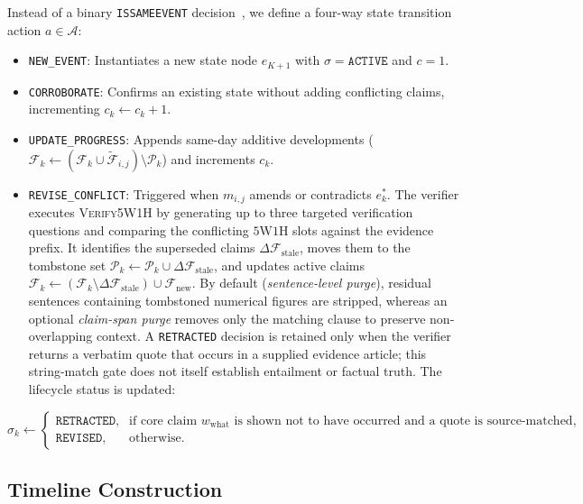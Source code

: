 \documentclass[journal]{IEEEtran}
\begin{document}
Instead of a binary \texttt{ISSAMEEVENT} decision~\cite{hu2024moments}, we define a four-way state transition action $a \in \mathcal{A}$:
\begin{itemize}
    \item \texttt{NEW\_EVENT}: Instantiates a new state node $e_{K+1}$ with $\sigma = \texttt{ACTIVE}$ and $c = 1$.
    \item \texttt{CORROBORATE}: Confirms an existing state without adding conflicting claims, incrementing $c_k \leftarrow c_k + 1$.
    \item \texttt{UPDATE\_PROGRESS}: Appends same-day additive developments ($\mathcal{F}_k \leftarrow (\mathcal{F}_k \cup \tilde{\mathcal{F}}_{i,j}) \setminus \mathcal{P}_k$) and increments $c_k$.
    \item \texttt{REVISE\_CONFLICT}: Triggered when $m_{i,j}$ amends or contradicts $e_k^*$. The verifier executes \textsc{Verify5W1H} by generating up to three targeted verification questions and comparing the conflicting $5\text{W}1\text{H}$ slots against the evidence prefix. It identifies the superseded claims $\Delta\mathcal{F}_{\text{stale}}$, moves them to the tombstone set $\mathcal{P}_k \leftarrow \mathcal{P}_k \cup \Delta\mathcal{F}_{\text{stale}}$, and updates active claims $\mathcal{F}_k \leftarrow (\mathcal{F}_k \setminus \Delta\mathcal{F}_{\text{stale}}) \cup \mathcal{F}_{\text{new}}$. By default (\textit{sentence-level purge}), residual sentences containing tombstoned numerical figures are stripped, whereas an optional \textit{claim-span purge} removes only the matching clause to preserve non-overlapping context. A \texttt{RETRACTED} decision is retained only when the verifier returns a verbatim quote that occurs in a supplied evidence article; this string-match gate does not itself establish entailment or factual truth. The lifecycle status is updated:
\end{itemize}
\begin{equation}
\sigma_k \leftarrow \begin{cases}
\texttt{RETRACTED}, & \text{if core claim } w_{\text{what}} \text{ is shown not to have occurred and a quote is source-matched}, \\
\texttt{REVISED}, & \text{otherwise}.
\end{cases}
\label{eq:status_update}
\end{equation}

\subsection{Timeline Construction}
\label{subsec:timeline_construction}
\end{document}
